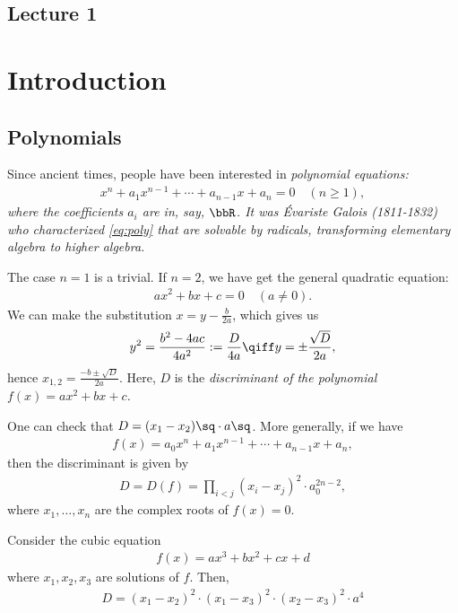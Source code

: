 \documentclass[a4paper]{article}
\begin{document}
\subsection*{Lecture 1} %
\section{Introduction}
\subsection{Polynomials}
Since ancient times, people have been interested in \it{polynomial equations}:
\begin{align}
  x^n + a_{1}x^{n-1} + \cdots + a_{n-1}x + a_n = 0\quad (n\geq 1),\label{eq:poly}
\end{align}
where the coefficients \( a_i \) are in, say, \( \bbR \).
It was \'Evariste Galois (1811-1832) who characterized \eqref{eq:poly} that are \it{solvable by radicals}, transforming elementary algebra to higher algebra.

The case \( n=1 \) is a trivial.
If \( n=2 \), we have get the general quadratic equation:
\begin{align*}
  ax^2+bx+c = 0\quad (a\neq 0).
\end{align*}
We can make the substitution \( x=y-\frac{b}{2a} \), which gives us
\begin{align*}
  y^2 = \frac{b^2-4ac}{4a^2} := \frac{D}{4a} \qiff y=\pm\frac{\sqrt D}{2a},
\end{align*}
hence \( x_{1,2} = \frac{-b\pm \sqrt D}{2a} \).
Here, \( D \) is the \it{discriminant} of the polynomial \( f(x) = ax^2+bx+c \).

One can check that \( D = (x_1-x_2)\sq\cdot a\sq \).
More generally, if we have \begin{align*}
  f(x) = a_0x^n+a_{1}x^{n-1}+\cdots+a_{n-1}x+a_n,
\end{align*}
then the discriminant is given by \begin{align*}
  D = D(f) = \prod_{i<j}(x_i-x_j)^2\cdot a_0^{2n-2},
\end{align*}
where \( x_1, \ldots, x_n \) are the complex roots of \( f(x) = 0 \).

\begin{example}
  Consider the cubic equation \begin{align*}
    f(x) = ax^3+bx^2+cx+d
  \end{align*} where \( x_1, x_2, x_3 \) are solutions of \( f \). Then, \begin{align*}
    D = (x_1-x_2)^2\cdot(x_1-x_3)^2\cdot(x_2-x_3)^2 \cdot a^4
  \end{align*}
\end{example}
\end{document}
